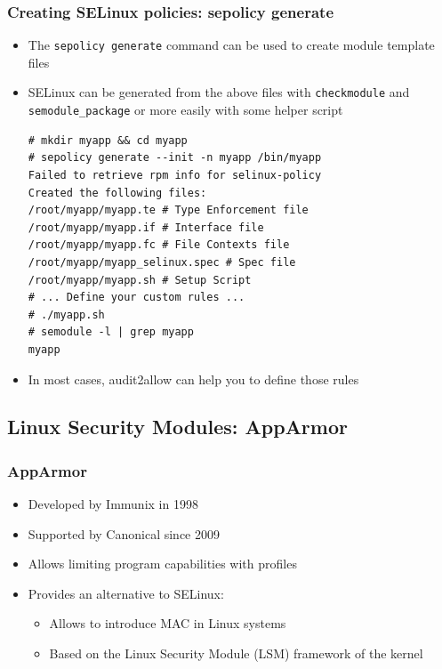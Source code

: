 \begin{frame}[fragile]
	\frametitle{Creating SELinux policies: sepolicy generate}
	\begin{itemize}
		\item The \texttt{sepolicy generate} command can be used to create module
			template files
		\item SELinux can be generated from the above files with
			\texttt{checkmodule} and \texttt{semodule\_package} or more easily with
			some helper script
			\begin{block}{}
				{\tiny
				\begin{verbatim}
# mkdir myapp && cd myapp
# sepolicy generate --init -n myapp /bin/myapp
Failed to retrieve rpm info for selinux-policy
Created the following files:
/root/myapp/myapp.te # Type Enforcement file
/root/myapp/myapp.if # Interface file
/root/myapp/myapp.fc # File Contexts file
/root/myapp/myapp_selinux.spec # Spec file
/root/myapp/myapp.sh # Setup Script
# ... Define your custom rules ...
# ./myapp.sh
# semodule -l | grep myapp
myapp
\end{verbatim}
}
			\end{block}
		\item In most cases, audit2allow can help you to define those rules
	\end{itemize}
\end{frame}

\subsection{Linux Security Modules: AppArmor}

\begin{frame}
	\frametitle{AppArmor}
	\begin{itemize}
		\item Developed by Immunix in 1998
		\item Supported by Canonical since 2009
		\item Allows limiting program capabilities with profiles
		\item Provides an alternative to SELinux:
			\begin{itemize}
				\item Allows to introduce MAC in Linux systems
				\item Based on the Linux Security Module (LSM) framework of the kernel
			\end{itemize}
	\end{itemize}
\end{frame}

